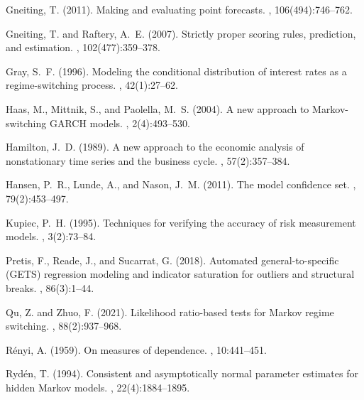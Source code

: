 \documentclass[12pt,letterpaper]{article}
\theoremstyle{plain}
\theoremstyle{remark}
\begin{document}
\begin{thebibliography}{}
Gneiting, T. (2011).
\newblock Making and evaluating point forecasts.
,
  106(494):746--762.

Gneiting, T. and Raftery, A.~E. (2007).
\newblock Strictly proper scoring rules, prediction, and estimation.
,
  102(477):359--378.

Gray, S.~F. (1996).
\newblock Modeling the conditional distribution of interest rates as a
  regime-switching process.
, 42(1):27--62.

Haas, M., Mittnik, S., and Paolella, M.~S. (2004).
\newblock A new approach to {M}arkov-switching {GARCH} models.
, 2(4):493--530.

Hamilton, J.~D. (1989).
\newblock A new approach to the economic analysis of nonstationary time series
  and the business cycle.
, 57(2):357--384.

Hansen, P.~R., Lunde, A., and Nason, J.~M. (2011).
\newblock The model confidence set.
, 79(2):453--497.

Kupiec, P.~H. (1995).
\newblock Techniques for verifying the accuracy of risk measurement models.
, 3(2):73--84.

Pretis, F., Reade, J., and Sucarrat, G. (2018).
\newblock Automated general-to-specific ({GETS}) regression modeling and
  indicator saturation for outliers and structural breaks.
, 86(3):1--44.

Qu, Z. and Zhuo, F. (2021).
\newblock Likelihood ratio-based tests for {M}arkov regime switching.
, 88(2):937--968.

R{\'e}nyi, A. (1959).
\newblock On measures of dependence.
, 10:441--451.

Ryd{\'e}n, T. (1994).
\newblock Consistent and asymptotically normal parameter estimates for hidden
  {M}arkov models.
, 22(4):1884--1895.


\end{thebibliography}
\end{document}
